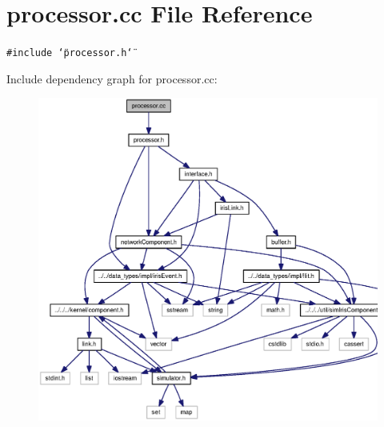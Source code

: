 \section{processor.cc File Reference}
\label{processor_8cc}
{\tt \#include \char`\"{}processor.h\char`\"{}}\par


Include dependency graph for processor.cc:\nopagebreak
\begin{figure}[H]
\begin{center}
\leavevmode
\includegraphics[width=330pt]{processor_8cc__incl}
\end{center}
\end{figure}
